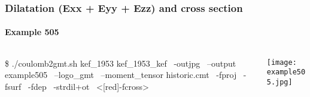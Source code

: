 \begin{frame}[t,fragile]
  \frametitle{Dilatation (Exx + Eyy + Ezz) and cross section}
  \framesubtitle{Example 505}
  \label{ch5fr:ex505}
\begin{columns}[t]
  \begin{column}{.5\textwidth}
\begin{scriptsize}
\begin{verbnobox}[\vbdelim]
\$ ./coulomb2gmt.sh kef_1953 kef_1953_kef \
                   -outjpg \ 
                   --output example505 \
                   --logo_gmt \
                   --moment_tensor historic.cmt \
                   -fproj \
                   -fsurf \
                   -fdep \
                   -strdil+ot \
                   <[red]-fcross>
\end{verbnobox}
\end{scriptsize}

  \end{column}
  \begin{column}{.5\textwidth}

\centering
  \texttt{[image: example505.jpg]}
  \end{column}
\end{columns}

\end{frame}
\note{}




















